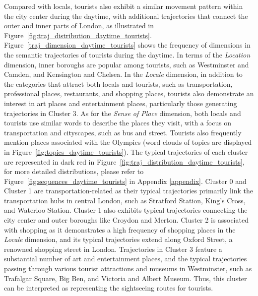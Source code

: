 \documentclass{article}
\theoremstyle{definition}
\theoremstyle{remark}
\begin{document}
Compared with locals, tourists also exhibit a similar movement pattern within the city center during the daytime, with additional trajectories that connect the outer and inner parts of London, as illustrated in Figure~\ref{fig:traj_distribution_daytime_tourists}. Figure~\ref{traj_dimension_daytime_tourists} shows the frequency of dimensions in the semantic trajectories of tourists during the daytime. In terms of the \textit{Location} dimension, inner boroughs are popular among tourists, such as Westminster and Camden, and Kensington and Chelsea. In the \textit{Locale} dimension, in addition to the categories that attract both locals and tourists, such as transportation, professional places, restaurants, and shopping places, tourists also demonstrate an interest in art places and entertainment places, particularly those generating trajectories in Cluster 3. As for the \textit{Sense of Place} dimension, both locals and tourists use similar words to describe the places they visit, with a focus on transportation and cityscapes, such as bus and street. Tourists also frequently mention places associated with the Olympics (word clouds of topics are displayed in Figure~\ref{fig:topics_daytime_tourists}). The typical trajectories of each cluster are represented in dark red in Figure~\ref{fig:traj_distribution_daytime_tourists}, for more detailed distributions, please refer to Figure~\ref{fig:sequences_daytime_tourists} in Appendix \ref{appendix}. Cluster 0 and Cluster 1 are transportation-related as their typical trajectories primarily link the transportation hubs in central London, such as Stratford Station, King's Cross, and Waterloo Station. Cluster 1 also exhibits typical trajectories connecting the city center and outer boroughs like Croydon and Merton. Cluster 2 is associated with shopping as it demonstrates a high frequency of shopping places in the \textit{Locale} dimension, and its typical trajectories extend along Oxford Street, a renowned shopping street in London. Trajectories in Cluster 3 feature a substantial number of art and entertainment places, and the typical trajectories passing through various tourist attractions and museums in Westminster, such as Trafalgar Square, Big Ben, and Victoria and Albert Museum. Thus, this cluster can be interpreted as representing the sightseeing routes for tourists.
\end{document}
